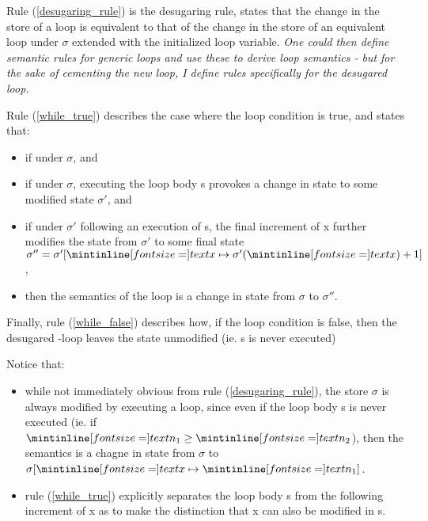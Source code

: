 
Rule (\ref{desugaring_rule}) is the desugaring rule, states that the change in
the store of a  loop is equivalent to that of the change in the store of
an equivalent  loop under $\sigma$ extended with the initialized loop
variable. \emph{One could then define semantic rules for generic 
loops and use these to derive  loop semantics - but for the sake of
cementing the new  loop, I define rules specifically for the desugared
loop.}

\bigskip

Rule (\ref{while_true}) describes the case where the loop condition is true, and
states that:

\begin{itemize}
  \item if  under $\sigma$, and
  \item if under $\sigma$, executing the  loop body \ms s provokes a
    change in state to some modified state $\sigma'$, and
  \item if under $\sigma'$ following an execution of \ms s, the final increment
    of \ms x further modifies the state from $\sigma'$ to some final state
    $\sigma'' = \sigma'[\ms x \mapsto \sigma'(\ms x) + 1]$,
  \item then the semantics of the  loop is a change in state from
    $\sigma$ to $\sigma''$.
\end{itemize}

\newpage

Finally, rule (\ref{while_false}) describes how, if the loop condition is false,
then the desugared -loop leaves the state unmodified (ie. \ms s is
never executed)

\bigskip

Notice that:

\begin{itemize}
  \item while not immediately obvious from rule (\ref{desugaring_rule}), the
    store $\sigma$ is always modified by executing a  loop, since even
    if the loop body \ms s is never executed (ie. if $\ms n_1 \geq \ms n_2$),
    then the semantics is a chagne in state from $\sigma$ to $\sigma[\ms x
    \mapsto \ms n_1]$.
  \item rule (\ref{while_true}) explicitly separates the loop body \ms s from
    the following increment of \ms x as to make the distinction that \ms x can
    also be modified in \ms s.
\end{itemize}

\Sectend

